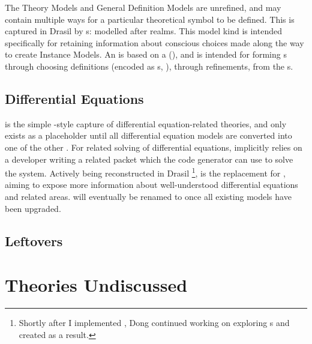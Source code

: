\currentDefiningExprHaskell{}

\currentMultiDefnHaskell{}

The Theory Models and General Definition Models are unrefined, and may contain
multiple ways for a particular theoretical symbol to be defined. This is
captured in Drasil by \EquationalRealm{}s: modelled after realms. This model kind is intended specifically for
retaining information about conscious choices made along the way to create
Instance Models. An \EquationalRealm{} is based on a \MultiDefn{}
(), and is intended for forming \QDefinition{}s
through choosing definitions (encoded as \DefiningExpr{}s,
), through refinements, from the \MultiDefn{}s.


\subsection{Differential Equations}

\DEModel{} is the simple \RelationConcept{}-style capture of differential
equation-related theories, and only exists as a placeholder until all
differential equation models are converted into one of the other \ModelKinds{}.
For related solving of differential equations, \DEModel{} implicitly relies on a
developer writing a related \ODEInfo{} packet which
the code generator can use to solve the system. Actively being reconstructed in
Drasil \cite{Chen2022MEng} \footnote{Shortly after I implemented \ModelKind{},
Dong continued working on exploring \DEModel{}s and created \NewDEModel{} as a
result.}, \NewDEModel{} is the replacement for \DEModel{}, aiming to expose more
information about well-understood differential equations and related areas.
\NewDEModel{} will eventually be renamed to \DEModel{} once all existing
\DEModel{} models have been upgraded.


\subsection{Leftovers}


\section{Theories Undiscussed}

